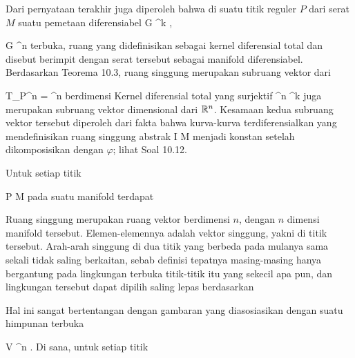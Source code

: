 Dari pernyataan terakhir juga diperoleh bahwa di suatu titik reguler $P$ dari serat $M$ suatu pemetaan diferensiabel
\maabb {\varphi} {G} {\R^k
} {,}

\mavergleichskette
{\vergleichskette
{G
}
{ \subseteq }{ \R^n
}
{  }{
}
{    }{
}
{   }{
}
}
{}{}{}
terbuka, ruang yang didefinisikan sebagai kernel diferensial total
 {} {}
dan disebut
berimpit dengan
serat tersebut sebagai manifold diferensiabel. Berdasarkan
Teorema 10.3,
ruang singgung
 {} {}
 merupakan subruang vektor dari

\mavergleichskette
{\vergleichskette
{ T_P\R^n
}
{ = }{ \R^n
}
{  }{
}
{    }{
}
{   }{
}
}
{}{}{}
berdimensi
Kernel diferensial total yang surjektif
 { \R^n } { \R^k
} {}
juga merupakan subruang vektor
dimensional dari ${\mathbb R}^n$. Kesamaan kedua subruang vektor tersebut diperoleh dari fakta bahwa kurva-kurva terdiferensialkan yang mendefinisikan ruang singgung abstrak
\maabbdisp {\gamma} {I} {M
} {}
menjadi konstan setelah dikomposisikan dengan $\varphi$; lihat
Soal 10.12.


Untuk setiap titik

\mavergleichskette
{\vergleichskette
{ P
}
{ \in }{ M
}
{  }{
}
{    }{
}
{   }{
}
}
{}{}{}
pada suatu manifold terdapat

Ruang singgung merupakan ruang vektor berdimensi $n$, dengan $n$ dimensi manifold tersebut. Elemen-elemennya adalah vektor singgung, yakni  di titik tersebut. Arah-arah singgung di dua titik yang berbeda pada mulanya sama sekali tidak saling berkaitan, sebab definisi tepatnya masing-masing hanya bergantung pada lingkungan terbuka titik-titik itu yang sekecil apa pun, dan lingkungan tersebut dapat dipilih saling lepas berdasarkan

Hal ini sangat bertentangan dengan gambaran yang diasosiasikan dengan suatu himpunan terbuka

\mavergleichskette
{\vergleichskette
{ V
}
{ \subseteq }{ \R^n
}
{  }{
}
{    }{
}
{   }{
}
}
{}{}{}
.
Di sana, untuk setiap titik

